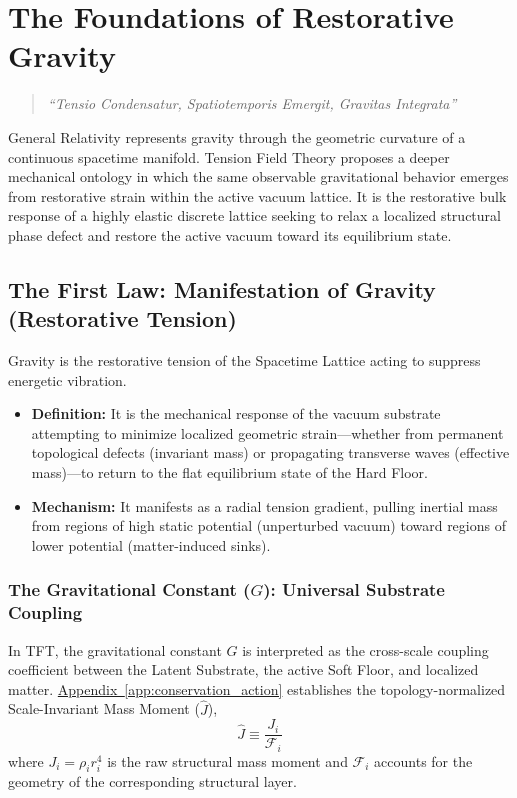 \chapter{The Foundations of Restorative Gravity}
\label{chap:restorative_gravity}

\begin{quote}
    \centering
    \textit{``Tensio Condensatur, Spatiotemporis Emergit, Gravitas Integrata''}
\end{quote}

\vspace{0.5em}
\noindent General Relativity represents gravity through the geometric curvature of a continuous spacetime manifold. Tension Field Theory proposes a deeper mechanical ontology in which the same observable gravitational behavior emerges from restorative strain within the active vacuum lattice. It is the restorative bulk response of a highly elastic discrete lattice seeking to relax a localized structural phase defect and restore the active vacuum toward its equilibrium state.

\section{The First Law: Manifestation of Gravity (Restorative Tension)}
Gravity is the restorative tension of the Spacetime Lattice acting to suppress energetic vibration.

\begin{itemize}
    \item \textbf{Definition:} It is the mechanical response of the vacuum substrate attempting to minimize localized geometric strain—whether from permanent topological defects (invariant mass) or propagating transverse waves (effective mass)—to return to the flat equilibrium state of the Hard Floor.
    \item \textbf{Mechanism:} It manifests as a radial tension gradient, pulling inertial mass from regions of high static potential (unperturbed vacuum) toward regions of lower potential (matter-induced sinks).
\end{itemize}

\subsection{The Gravitational Constant ($G$): Universal Substrate Coupling}

In TFT, the gravitational constant $G$ is interpreted as the cross-scale coupling coefficient between the Latent Substrate, the active Soft Floor, and localized matter. \hyperref[app:conservation_action]{Appendix~\ref*{app:conservation_action}} establishes the topology-normalized Scale-Invariant Mass Moment ($\hat{J}$),
\begin{equation}
    \hat{J} \equiv \frac{J_i}{\mathcal{F}_i}
\end{equation}
where $J_i = \rho_i r_i^4$ is the raw structural mass moment and $\mathcal{F}_i$ accounts for the geometry of the corresponding structural layer.

